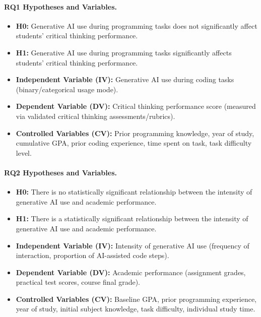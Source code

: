 \documentclass[11pt,a4paper]{article}
\begin{document}
\paragraph{RQ1 Hypotheses and Variables.}
\begin{itemize}[leftmargin=*, itemsep=0.1em]
  \item \textbf{H0:} Generative AI use during programming tasks does not significantly affect students' critical thinking performance.
  \item \textbf{H1:} Generative AI use during programming tasks significantly affects students' critical thinking performance.
  \item \textbf{Independent Variable (IV):} Generative AI use during coding tasks (binary/categorical usage mode).
  \item \textbf{Dependent Variable (DV):} Critical thinking performance score (measured via validated critical thinking assessments/rubrics).
  \item \textbf{Controlled Variables (CV):} Prior programming knowledge, year of study, cumulative GPA, prior coding experience, time spent on task, task difficulty level.
\end{itemize}

\paragraph{RQ2 Hypotheses and Variables.}
\begin{itemize}[leftmargin=*, itemsep=0.1em]
  \item \textbf{H0:} There is no statistically significant relationship between the intensity of generative AI use and academic performance.
  \item \textbf{H1:} There is a statistically significant relationship between the intensity of generative AI use and academic performance.
  \item \textbf{Independent Variable (IV):} Intensity of generative AI use (frequency of interaction, proportion of AI-assisted code steps).
  \item \textbf{Dependent Variable (DV):} Academic performance (assignment grades, practical test scores, course final grade).
  \item \textbf{Controlled Variables (CV):} Baseline GPA, prior programming experience, year of study, initial subject knowledge, task difficulty, individual study time.
\end{itemize}
\end{document}
